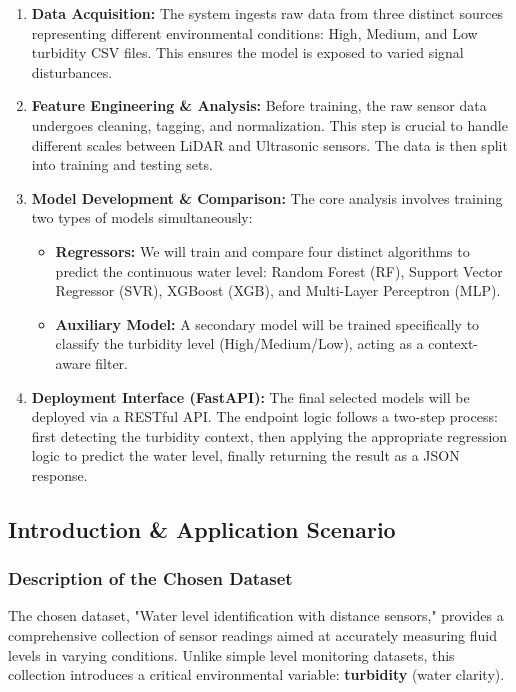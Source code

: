 \documentclass[12pt, a4paper]{article}
\begin{document}
\begin{enumerate}
    \item \textbf{Data Acquisition:} 
    The system ingests raw data from three distinct sources representing different environmental conditions: High, Medium, and Low turbidity CSV files. This ensures the model is exposed to varied signal disturbances.
    
    \item \textbf{Feature Engineering \& Analysis:} 
    Before training, the raw sensor data undergoes cleaning, tagging, and normalization. This step is crucial to handle different scales between LiDAR and Ultrasonic sensors. The data is then split into training and testing sets.
    
    \item \textbf{Model Development \& Comparison:} 
    The core analysis involves training two types of models simultaneously:
    \begin{itemize}
        \item \textbf{Regressors:} We will train and compare four distinct algorithms to predict the continuous water level: Random Forest (RF), Support Vector Regressor (SVR), XGBoost (XGB), and Multi-Layer Perceptron (MLP).
        \item \textbf{Auxiliary Model:} A secondary model will be trained specifically to classify the turbidity level (High/Medium/Low), acting as a context-aware filter.
    \end{itemize}
    
    \item \textbf{Deployment Interface (FastAPI):} 
    The final selected models will be deployed via a RESTful API. The endpoint logic follows a two-step process: first detecting the turbidity context, then applying the appropriate regression logic to predict the water level, finally returning the result as a JSON response.
\end{enumerate}

\vspace{0.87cm}

\subsection{Introduction \& Application Scenario}

\subsubsection{Description of the Chosen Dataset}
The chosen dataset, "Water level identification with distance sensors," provides a comprehensive collection of sensor readings aimed at accurately measuring fluid levels in varying conditions. Unlike simple level monitoring datasets, this collection introduces a critical environmental variable: \textbf{turbidity} (water clarity).
\end{document}
